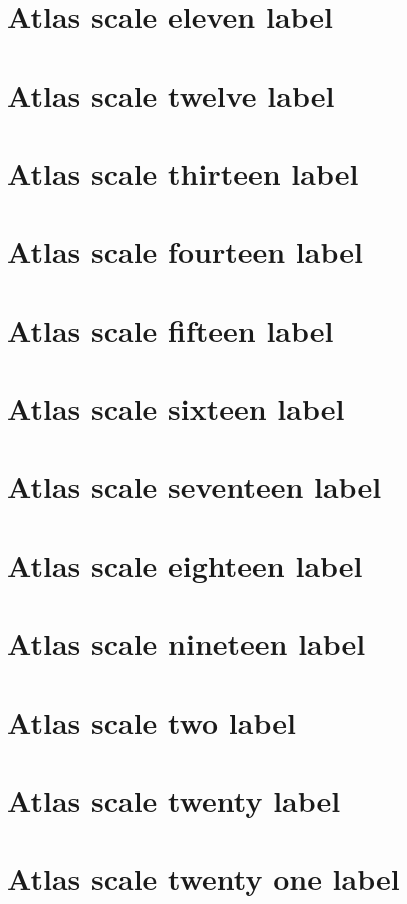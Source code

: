 \documentclass[11pt]{article}
\theoremstyle{definition}
\begin{document}
\section{Atlas scale eleven label}
\label{ll:labels:atlas-s11}
\section{Atlas scale twelve label}
\label{ll:labels:atlas-s12}
\section{Atlas scale thirteen label}
\label{ll:labels:atlas-s13}
\section{Atlas scale fourteen label}
\label{ll:labels:atlas-s14}
\section{Atlas scale fifteen label}
\label{ll:labels:atlas-s15}
\section{Atlas scale sixteen label}
\label{ll:labels:atlas-s16}
\section{Atlas scale seventeen label}
\label{ll:labels:atlas-s17}
\section{Atlas scale eighteen label}
\label{ll:labels:atlas-s18}
\section{Atlas scale nineteen label}
\label{ll:labels:atlas-s19}
\section{Atlas scale two label}
\label{ll:labels:atlas-s2}
\section{Atlas scale twenty label}
\label{ll:labels:atlas-s20}
\section{Atlas scale twenty one label}
\label{ll:labels:atlas-s21}
\end{document}
